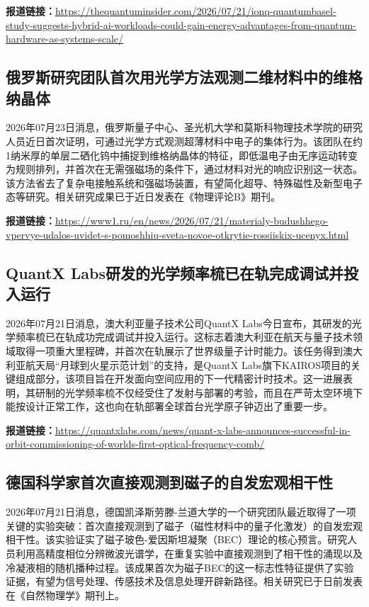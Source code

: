 \documentclass[12pt,a4paper]{ctexart}
\begin{document}
\noindent\textbf{报道链接：}\url{https://thequantuminsider.com/2026/07/21/ionq-quantumbasel-study-suggests-hybrid-ai-workloads-could-gain-energy-advantages-from-quantum-hardware-as-systems-scale/}

\subsection{ 俄罗斯研究团队首次用光学方法观测二维材料中的维格纳晶体 }

2026年07月23日消息，俄罗斯量子中心、圣光机大学和莫斯科物理技术学院的研究人员近日首次证明，可通过光学方式观测超薄材料中电子的集体行为。该团队在约1纳米厚的单层二硒化钨中捕捉到维格纳晶体的特征，即低温电子由无序运动转变为规则排列，并首次在无需强磁场的条件下，通过材料对光的响应识别这一状态。该方法省去了复杂电接触系统和强磁场装置，有望简化超导、特殊磁性及新型电子态等研究。相关研究成果已于近日发表在《物理评论B》期刊。

\noindent\textbf{报道链接：}\url{https://www1.ru/en/news/2026/07/21/materialy-budushhego-vpervye-udalos-uvidet-s-pomoshhiu-sveta-novoe-otkrytie-rossiiskix-ucenyx.html}

\subsection{ QuantX Labs研发的光学频率梳已在轨完成调试并投入运行 }

2026年07月21日消息，澳大利亚量子技术公司QuantX Labs今日宣布，其研发的光学频率梳已在轨成功完成调试并投入运行。这标志着澳大利亚在航天与量子技术领域取得一项重大里程碑，并首次在轨展示了世界级量子计时能力。该任务得到澳大利亚航天局“月球到火星示范计划”的支持，是QuantX Labs旗下KAIROS项目的关键组成部分，该项目旨在开发面向空间应用的下一代精密计时技术。这一进展表明，其研制的光学频率梳不仅经受住了发射与部署的考验，而且在严苛太空环境下能按设计正常工作，这也向在轨部署全球首台光学原子钟迈出了重要一步。

\noindent\textbf{报道链接：}\url{https://quantxlabs.com/news/quant-x-labs-announces-successful-in-orbit-commissioning-of-worlds-first-optical-frequency-comb/}

\subsection{ 德国科学家首次直接观测到磁子的自发宏观相干性 }

2026年07月21日消息，德国凯泽斯劳滕-兰道大学的一个研究团队最近取得了一项关键的实验突破：首次直接观测到了磁子（磁性材料中的量子化激发）的自发宏观相干性。该实验证实了磁子玻色-爱因斯坦凝聚（BEC）理论的核心预言。研究人员利用高精度相位分辨微波光谱学，在重复实验中直接观测到了相干性的涌现以及冷凝液相的随机播种过程。该成果首次为磁子BEC的这一标志性特征提供了实验证据，有望为信号处理、传感技术及信息处理开辟新路径。相关研究已于日前发表在《自然物理学》期刊上。
\end{document}
